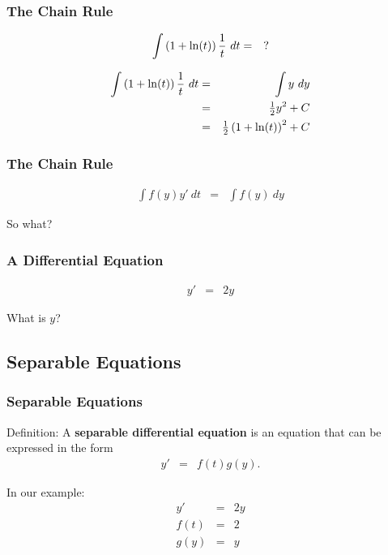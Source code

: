 \begin{frame}
  \frametitle{The Chain Rule}

  \begin{eqnarray*}
    \int \left( 1 + \ln(t) \right) \frac{1}{t} ~ dt & = & ?
  \end{eqnarray*}


   {
    \begin{eqnarray*}
      \int \left( 1 + \ln(t) \right) \frac{1}{t} ~ dt & = & \int y ~ dy \\
      & = & \mbox{$\frac{1}{2}$} y^2 + C \\
      & = & \mbox{$\frac{1}{2}$} \left( 1+\ln(t) \right)^2 + C
    \end{eqnarray*}
  }


\end{frame}

\begin{frame}
  \frametitle{The Chain Rule}
  \begin{eqnarray*}
    \int f(y) y' ~ dt & = & \int f(y) ~ dy
  \end{eqnarray*}

  So what?

\end{frame}


\begin{frame}
  \frametitle{A Differential Equation}
  
  \begin{eqnarray*}
    y' & = & 2y
  \end{eqnarray*}

  What is $y$?


\end{frame}

\subsection{Separable Equations}

\begin{frame}
  \frametitle{Separable Equations}

  Definition: A \textbf{separable differential equation} is an
  equation that can be expressed in the form 
  \begin{eqnarray*}
    y' & = & f(t) g(y).
  \end{eqnarray*}

  In our example:
  \begin{eqnarray*}
    y' & = & 2y \\
    f(t) & = & 2 \\
    g(y) & = & y
  \end{eqnarray*}

\end{frame}


